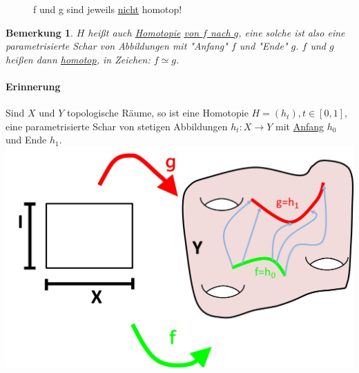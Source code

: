 \documentclass[a4paper,11pt,notitlepage]{report}
\newtheorem{remark}{Bemerkung}[chapter]
\begin{document}
\begin{figure}[h]
\centering
{}\qquad
{}
\caption{f und g sind jeweils \underline{nicht} homotop!}
\end{figure}

\begin{remark}
$H$ heißt auch \underline{Homotopie} \underline{\underline{von $f$ nach $g$}}, eine solche ist also eine parametrisierte Schar von Abbildungen mit "Anfang" $f$ und "Ende" $g$. $f$ und $g$ heißen dann \underline{homotop}, in Zeichen: $f \simeq g$.
\end{remark}

\paragraph{Erinnerung}
Sind $X$ und $Y$ topologische Räume, so ist eine Homotopie $H = (h_t), t \in [0,1]$, eine parametrisierte Schar von stetigen Abbildungen $h_t \colon X \rightarrow Y$ mit \underline{Anfang} $h_0$ und Ende $h_1$. \includegraphics[width=1\textwidth]{images/Homotopie_param.jpg}
\end{document}
